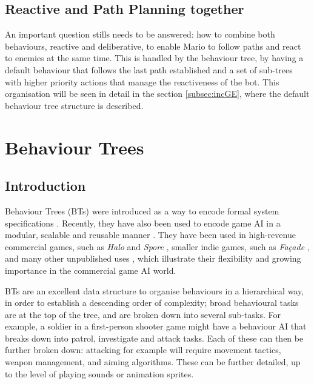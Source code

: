 \documentclass[conference]{IEEEtran}
\begin{document}
\subsection{Reactive and Path Planning together}

An important question stills needs to be answered: how to combine both
behaviours, reactive and deliberative, to enable Mario to follow paths and
react to enemies at the same time. This is handled by the behaviour tree, 
by having a default behaviour that follows the last path established and a 
set of sub-trees with higher priority actions that manage the reactiveness
of the bot. This organisation will be seen in detail in the section \ref{subsec:incGE},
where the default behaviour tree structure is described.

\section{Behaviour Trees}\label{BTs}

\subsection{Introduction}

Behaviour Trees (BTs) were introduced as a way to encode
formal system specifications \cite{CH07}. Recently, they have also been
used to encode game AI in a modular, scalable and reusable
manner \cite{CDC10}. They have been used in high-revenue commercial games, such
as \textit{Halo} \cite{Isl05} and \textit{Spore} \cite{Mch07}, smaller indie games, such
as \textit{Fa\c{c}ade} \cite{MS04}, and many other unpublished uses
\cite{CDC10}, which illustrate their flexibility and growing importance in the
commercial game AI world.


BTs are an excellent data structure to organise behaviours in a hierarchical 
way, in order to establish a descending order of complexity;
broad behavioural tasks are at the top of the tree, and
are broken down into several sub-tasks. For example, a soldier in a
first-person shooter game might have a behaviour AI that breaks down into
patrol, investigate and attack tasks. Each of these can then be further broken
down: attacking for example will require movement tactics, weapon
management, and aiming algorithms. These can be further detailed, up
to the level of playing sounds or animation sprites.
\end{document}
